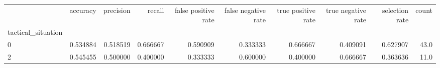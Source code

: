 \begin{tabular}{lrrrrrrrrr}
\toprule
{} &  accuracy &  precision &    recall &  false positive rate &  false negative rate &  true positive rate &  true negative rate &  selection rate &  count \\
tactical\_situation &           &            &           &                      &                      &                     &                     &                 &        \\
\midrule
0                  &  0.534884 &   0.518519 &  0.666667 &             0.590909 &             0.333333 &            0.666667 &            0.409091 &        0.627907 &   43.0 \\
2                  &  0.545455 &   0.500000 &  0.400000 &             0.333333 &             0.600000 &            0.400000 &            0.666667 &        0.363636 &   11.0 \\
\bottomrule
\end{tabular}
